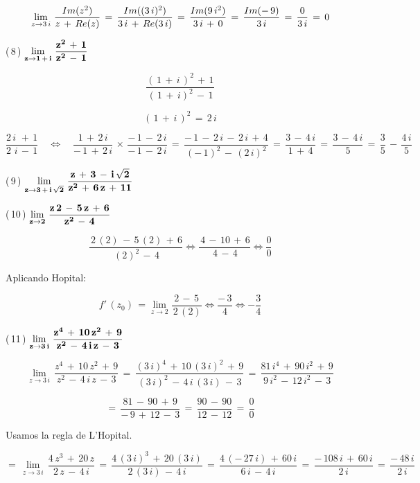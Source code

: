 \documentclass[a4paper,11pt,openany]{book}
\begin{document}
$$\displaystyle\lim_{z \to 3\,i}\,\dfrac{\mathnormal{Im}(z^{2})}{z\,+\,\mathnormal{Re}(z)}\,=\,\dfrac{\mathnormal{Im}((3\,i)^{2})}{3\,i\,+\,\mathnormal{Re}(3\,i)}\,=\,\dfrac{\mathnormal{Im}(9\,i^{2})}{3\,i\,+\,0}\,=\,\dfrac{\mathnormal{Im}(-\,9)}{3\,i}\,=\,\dfrac{0}{3\,i}\,=\,0$$

\textcolor{ao(english)}{(\,8\,)} $\bf{\displaystyle\lim_{z \to 1\,+\,i}\,\dfrac{z^{2}\,+\,1}{z^{2}\,-\,1}}$

$$\dfrac{(\,1\,+\,i\,)^{2}\,+\,1}{(\,1\,+\,i)^{2}\,-\,1}$$

$$(\,1\,+\,i\,)^{2}\,=\,2\,i$$

$$\dfrac{2\,i\,\,+\,1}{2\,\,i\,-\,1} \quad\iff\quad \dfrac{1\,+\,2\,i}{-\,1\,+\,2\,i}\,\times\,\dfrac{-\,1\,-\,2\,i}{-\,1\,-\,2\,i}\,=\,\dfrac{-\,1\,-\,2\,i\,-\,2\,i\,+\,4}{(-\,1)^{2}\,-\,(2\,i)^{2}}\,=\,\dfrac{3\,-\,4\,i}{1\,+\,4}\,=\,\dfrac{3\,-\,4\,i}{5}\,=\,\boxed{\dfrac{3}{5}\,-\,\dfrac{4\,i}{5}}$$

\textcolor{ao(english)}{(\,9\,)} $\bf{\displaystyle\lim_{z \to 3\,+\,i\,\sqrt{2}}\,\dfrac{z\,+\,3\,-\,i\,\sqrt{2}}{z^{2}\,+\,6\,z\,+\,11}}$

\textcolor{ao(english)}{(\,10\,)} $\bf{\displaystyle\lim_{z \to 2}\,\dfrac{z\,2\,-\,5\,z\,+\,6}{z^{2}\,-\,4}}$

$$ \dfrac{\,2\,(2)\,-\,5\,(2)\,+\,6}{\,(2)^{2}\,-\,4} \iff \dfrac{\,4\,-\,10\,+\,6}{\,4\,-\,4} \iff \dfrac{0}{0}$$

Aplicando Hopital:

$$ f'\,(z_{0})\,= \displaystyle\lim_{z \to 2} \dfrac{\,2\,-\,5\,}{\,2\,(2)} \iff \dfrac{-\,3}{4} \iff \boxed{-\dfrac{3}{4}}$$

\textcolor{ao(english)}{(\,11\,)} $\bf{\displaystyle\lim_{z \to 3\,i}\,\dfrac{z^{4}\,+\,10\,z^{2}\,+\,9}{z^{2}\,-\,4\,i\,z\,-\,3}}$

$$\displaystyle\lim_{z \to 3\,i}\,\dfrac{z^{4}\,+\,10\,z^{2}\,+\,9}{z^{2}\,-\,4\,i\,z\,-\,3}\,=\,\dfrac{(3\,i)^{4}\,+\,10\,(3\,i)^{2}\,+\,9}{(3\,i)^{2}\,-\,4\,i\,(3\,i)\,-\,3}\,=\,\dfrac{81\,i^{4}\,+\,90\,i^{2}\,+\,9}{9\,i^{2}\,-\,12\,i^{2}\,-\,3}$$

$$=\,\dfrac{81\,-\,90\,+\,9}{-\,9\,+\,12\,-\,3}\,=\,\dfrac{90\,-\,90}{12\,-\,12}\,=\,\dfrac{0}{0}$$

\textcolor{ao(english)}{} Usamos la regla de L'Hopital.


$$=\,\displaystyle\lim_{z \to 3\,i}\,\dfrac{4\,z^{3}\,+\,20\,z}{2\,z\,-\,4\,i}\,=\,\dfrac{4\,(3\,i)^{3}\,+\,20\,(3\,i)}{2\,(3\,i)\,-\,4\,i}\,=\,\dfrac{4\,(-\,27\,i)\,+\,60\,i}{6\,i\,-\,4\,i}\,=\,\dfrac{-\,108\,i\,+\,60\,i}{2\,i}\,=\,\dfrac{-\,48\,i}{2\,i}$$
\end{document}

